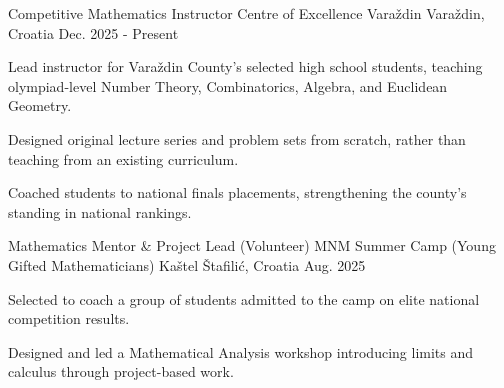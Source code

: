 \begin{cventries}
  \cventry
    {Competitive Mathematics Instructor} %
    {Centre of Excellence Varaždin} %
    {Varaždin, Croatia} %
    {Dec. 2025 - Present} %
    {
      \begin{cvitems}
        \item {Lead instructor for Varaždin County's selected high school students, teaching olympiad-level Number Theory, Combinatorics, Algebra, and Euclidean Geometry.}
        \item {Designed original lecture series and problem sets from scratch, rather than teaching from an existing curriculum.}
        \item {Coached students to national finals placements, strengthening the county's standing in national rankings.}
      \end{cvitems}
      \vspace{4mm}
    }

  \cventry
    {Mathematics Mentor \& Project Lead (Volunteer)} %
    {MNM Summer Camp (Young Gifted Mathematicians)} %
    {Kaštel Štafilić, Croatia} %
    {Aug. 2025} %
    {
      \begin{cvitems}
        \item {Selected to coach a group of students admitted to the camp on elite national competition results.}
        \item {Designed and led a Mathematical Analysis workshop introducing limits and calculus through project-based work.}
      \end{cvitems}
      \vspace{4mm}
    }

\end{cventries}
